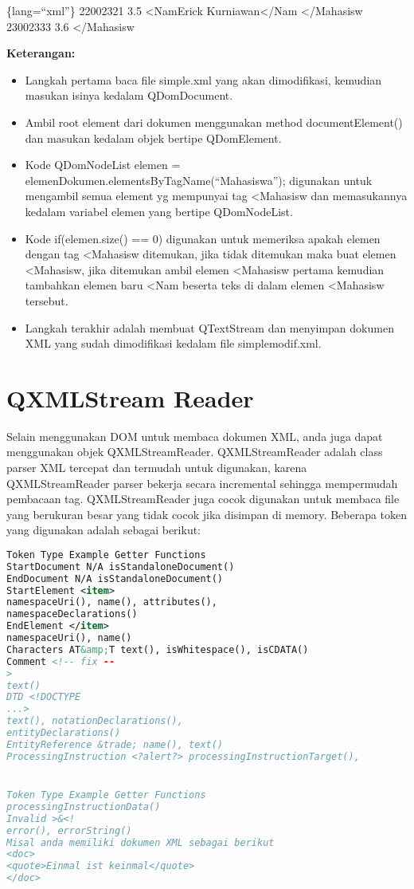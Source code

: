 \{lang=``xml''\} 22002321 3.5 \textless{}NamErick
Kurniawan\textless{}/Nam \textless{}/Mahasisw 23002333 3.6
\textless{}/Mahasisw

\textbf{Keterangan:}

\begin{itemize}

\item
  Langkah pertama baca file simple.xml yang akan dimodifikasi, kemudian
  masukan isinya kedalam QDomDocument.
\item
  Ambil root element dari dokumen menggunakan method documentElement()
  dan masukan kedalam objek bertipe QDomElement.
\item
  Kode QDomNodeList elemen =
  elemenDokumen.elementsByTagName(``Mahasiswa''); digunakan untuk
  mengambil semua element yg mempunyai tag \textless{}Mahasisw dan
  memasukannya kedalam variabel elemen yang bertipe QDomNodeList.
\item
  Kode if(elemen.size() == 0) digunakan untuk memeriksa apakah elemen
  dengan tag \textless{}Mahasisw ditemukan, jika tidak ditemukan maka
  buat elemen \textless{}Mahasisw, jika ditemukan ambil elemen
  \textless{}Mahasisw pertama kemudian tambahkan elemen baru
  \textless{}Nam beserta teks di dalam elemen \textless{}Mahasisw
  tersebut.
\item
  Langkah terakhir adalah membuat QTextStream dan menyimpan dokumen XML
  yang sudah dimodifikasi kedalam file simplemodif.xml.
\end{itemize}

\section{QXMLStream Reader}\label{qxmlstream-reader}

Selain menggunakan DOM untuk membaca dokumen XML, anda juga dapat
menggunakan objek QXMLStreamReader. QXMLStreamReader adalah class parser
XML tercepat dan termudah untuk digunakan, karena QXMLStreamReader
parser bekerja secara incremental sehingga mempermudah pembacaan tag.
QXMLStreamReader juga cocok digunakan untuk membaca file yang berukuran
besar yang tidak cocok jika disimpan di memory. Beberapa token yang
digunakan adalah sebagai berikut:

\begin{lstlisting}[language=xml]
Token Type Example Getter Functions
StartDocument N/A isStandaloneDocument()
EndDocument N/A isStandaloneDocument()
StartElement <item>
namespaceUri(), name(), attributes(),
namespaceDeclarations()
EndElement </item>
namespaceUri(), name()
Characters AT&amp;T text(), isWhitespace(), isCDATA()
Comment <!-- fix --
>
text()
DTD <!DOCTYPE
...>
text(), notationDeclarations(),
entityDeclarations()
EntityReference &trade; name(), text()
ProcessingInstruction <?alert?> processingInstructionTarget(),


Token Type Example Getter Functions
processingInstructionData()
Invalid >&<!
error(), errorString()
Misal anda memiliki dokumen XML sebagai berikut
<doc>
<quote>Einmal ist keinmal</quote>
</doc>
\end{lstlisting}

